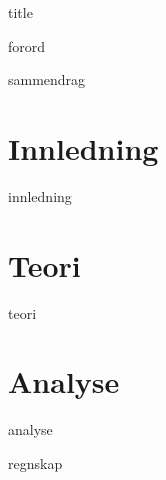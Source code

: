 \documentclass[a4paper,12pt,norsk, openright]{memoir}
\begin{document}
\frontmatter
\pagestyle{empty}

{title}

\thispagestyle{empty}
\pagestyle{plain}
{forord}

{sammendrag}

\cleardoublepage
\tableofcontents*

\cleardoublepage
\listoffigures

\listoftables

\mainmatter
\pagestyle{fancy}
\chapter{Innledning}
{innledning}

\chapter{Teori}
{teori}

\chapter{Analyse}
{analyse}

\printbibliography[heading = bibintoc, title = Litteraturliste]

\addappendix
{regnskap}
\end{document}
